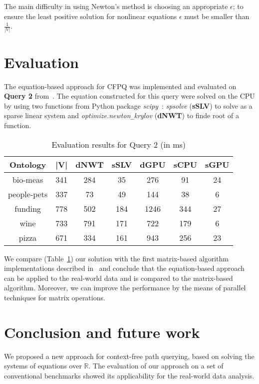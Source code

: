 \documentclass[sigconf]{acmart}
\begin{document}
The main difficulty in using Newton's method is choosing an appropriate $\epsilon$; to ensure the least positive solution for nonlinear equations $\epsilon$ must be smaller than $\frac{1}{|V|}$.


\section{Evaluation}

The equation-based approach for CFPQ was implemented and evaluated on \textbf{Query 2} from~\cite{azimov2018context}.
The equation constructed for this query were solved on the CPU by using two functions from Python package \textit{scipy}~\cite{scipy}:
\textit{spsolve} (\textbf{sSLV}) to solve as a sparse linear system
and
\textit{optimize.newton\texttt{\_}krylov} (\textbf{dNWT}) to finde root of a function.

\begin{table}[h]
\centering
\caption{Evaluation results for Query 2 (in ms)}
\label{tbl2}
\begin{tabular}{ | c | c || c | c || c | c | c |}
\hline
Ontology    & |V| & dNWT & sSLV & dGPU & sCPU &  sGPU \\
\hline
\hline
bio-meas    & 341 &  284 & 35   & 276  & 91  & 24\\
people-pets & 337 &  73  & 49   & 144  & 38  & 6\\
funding     & 778 &  502 & 184  & 1246 & 344 & 27\\
wine        & 733 &  791 & 171  & 722  & 179 & 6\\
pizza       & 671 &  334 & 161  & 943  & 256 & 23\\
\hline
\end{tabular}

\end{table}

We compare (Table~\ref{tbl2}) our solution with the first matrix-based algorithm implementations described in~\cite{azimov2018context} and conclude that the equation-based approach can be applied to the real-world data and is compared to the matrix-based algorithm.
Moreover, we can improve the performance by the means of parallel techniques for matrix operations.

\section{Conclusion and future work}

We proposed a new approach for context-free path querying, based on solving the systems of equations over $\mathbb{R}$.
The evaluation of our approach on a set of conventional benchmarks showed its applicability for the real-world data analysis.
\end{document}
